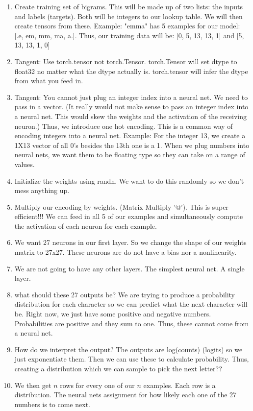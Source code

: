 \documentclass[a4paper, 11pt, oneside]{researchjournal} %
\begin{document}
\begin{enumerate}
\begin{enumerate}
        \item Create training set of bigrams. This will be made up of two lists: the inputs and labels (targets). Both will be integers to our lookup table. We will then create tensors from these. Example: "emma" has 5 examples for our model: [.e, em, mm, ma, a.]. Thus, our training data will be: [0, 5, 13, 13, 1] and [5, 13, 13, 1, 0]
        \item Tangent: Use torch.tensor not torch.Tensor. torch.Tensor will set dtype to float32 no matter what the dtype actually is. torch.tensor will infer the dtype from what you feed in. 
        \item Tangent: You cannot just plug an integer index into a neural net. We need to pass in a vector. (It really would not make sense to pass an integer index into a neural net. This would skew the weights and the activation of the receiving neuron.) Thus, we introduce one hot encoding. This is a common way of encoding integers into a neural net. Example: For the integer 13, we create a 1X13 vector of all 0's besides the 13th one is a 1. When we plug numbers into neural nets, we want them to be floating type so they can take on a range of values.  
        \item Initialize the weights using randn. We want to do this randomly so we don't mess anything up. 
        \item Multiply our encoding by weights. (Matrix Multiply '@'). This is super efficient!!! We can feed in all 5 of our examples and simultaneously compute the activation of each neuron for each example. 
        \item We want 27 neurons in our first layer. So we change the shape of our weights matrix to 27x27. These neurons are do not have a bias nor a nonlinearity. \item We are not going to have any other layers. The simplest neural net. A single layer. 
        \item what should these 27 outputs be? We are trying to produce a probability distribution for each character so we can predict what the next character will be. Right now, we just have some positive and negative numbers. Probabilities are positive and they sum to one. Thus, these cannot come from a neural net. 
        \item How do we interpret the output? The outputs are log(counts) (logits) so we just exponentiate them. Then we can use these to calculate probability. Thus, creating a distribution which we can sample to pick the next letter??
        \item We then get $n$ rows for every one of our $n$ examples. Each row is a distribution. The neural nets assignment for how likely each one of the 27 numbers is to come next.  

\end{enumerate}
\end{enumerate}
\end{document}
